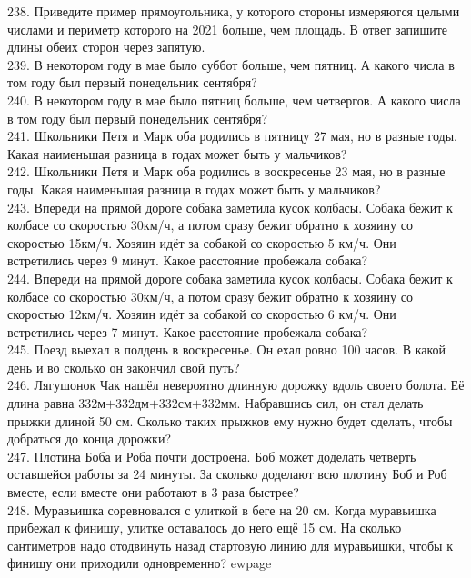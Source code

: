 238. Приведите пример прямоугольника, у которого стороны измеряются целыми числами и периметр которого на 2021 больше, чем площадь. В ответ запишите длины обеих сторон через запятую.\\
239. В некотором году в мае было суббот больше, чем пятниц. А какого числа в том году был первый понедельник сентября?\\
240. В некотором году в мае было пятниц больше, чем четвергов. А какого числа в том году был первый понедельник сентября?\\
241. Школьники Петя и Марк оба родились в пятницу 27 мая, но в разные годы. Какая наименьшая разница в годах может быть у мальчиков?\\
242. Школьники Петя и Марк оба родились в воскресенье 23 мая, но в разные годы. Какая наименьшая разница в годах может быть у мальчиков?\\
243. Впереди на прямой дороге собака заметила кусок колбасы. Собака бежит к колбасе со скоростью 30км/ч, а потом сразу бежит обратно к хозяину со скоростью 15км/ч. Хозяин идёт за собакой со скоростью 5 км/ч. Они встретились через 9 минут. Какое расстояние пробежала собака?\\
244. Впереди на прямой дороге собака заметила кусок колбасы. Собака бежит к колбасе со скоростью 30км/ч, а потом сразу бежит обратно к хозяину со скоростью 12км/ч. Хозяин идёт за собакой со скоростью 6 км/ч. Они встретились через 7 минут. Какое расстояние пробежала собака?\\
245. Поезд выехал в полдень в воскресенье. Он ехал ровно 100 часов. В какой день и во сколько он закончил свой путь?\\
246. Лягушонок Чак нашёл невероятно длинную дорожку вдоль своего болота. Её длина равна 332м$+$332дм$+$332см$+$332мм. Набравшись сил, он стал делать прыжки длиной 50 см. Сколько таких прыжков ему нужно будет сделать, чтобы добраться до конца дорожки?\\
247. Плотина Боба и Роба почти достроена. Боб может доделать четверть оставшейся работы за 24 минуты. За сколько доделают всю плотину Боб и Роб вместе, если вместе они работают в 3 раза быстрее?\\
248. Муравьишка соревновался с улиткой в беге на 20 см. Когда муравьишка прибежал к финишу, улитке оставалось до него ещё 15 см. На сколько сантиметров надо отодвинуть назад стартовую линию для муравьишки, чтобы к финишу они приходили одновременно?
ewpage


